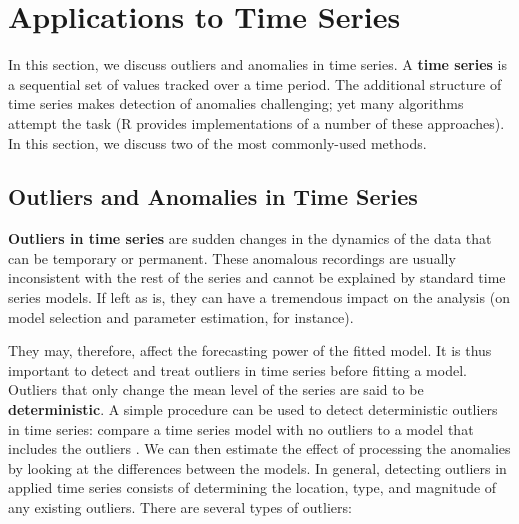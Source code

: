 \section{Applications to Time Series} \label{Section:5}
In this section, we discuss outliers and anomalies in time series. A \textbf{time series} is a sequential set of values tracked over a time period. The additional structure of time series makes detection of anomalies challenging; yet many algorithms attempt the task (R provides implementations of a number of these approaches). In this section, we discuss two of the most commonly-used methods. 
\subsection{Outliers and Anomalies in Time Series} \textbf{Outliers in time series} are sudden changes in the dynamics of the data that can be temporary or permanent. These anomalous recordings are usually inconsistent with the rest of the series and cannot be explained by standard time series models. If left as is, they can have a tremendous impact on the analysis (on  model selection and parameter estimation, for instance). 
\par They may, therefore, affect the forecasting power of the fitted model. It is thus important to detect and treat outliers in time series before fitting a model. \newl Outliers that only change the mean level of the series are said to be \textbf{deterministic}. A simple procedure can be used to detect deterministic outliers in time series: compare a time series model with no outliers to a model that includes the outliers \cite{tsay}. We can then estimate the effect of processing the anomalies by looking at the differences between the models. \newl In general, detecting outliers in applied time series consists of determining the location, type, and magnitude of any existing outliers. There are several types of outliers: 
